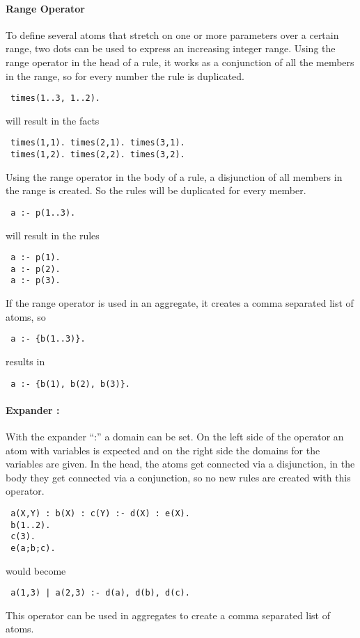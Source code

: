\documentclass[a4paper,10pt]{article}
\begin{document}
\paragraph{Range Operator}
To define several atoms that stretch on one or more parameters over a certain range, two dots can be used to express an increasing integer range.
Using the range operator in the head of a rule, it works as a conjunction of all the members in the range, so for every number the rule is duplicated.
\begin{verbatim}
 times(1..3, 1..2).
\end{verbatim}
will result in the facts
\begin{verbatim}
 times(1,1). times(2,1). times(3,1).
 times(1,2). times(2,2). times(3,2).
\end{verbatim}

Using the range operator in the body of a rule, a disjunction of all members in the range is created. So the rules will be duplicated for every member.
\begin{verbatim}
 a :- p(1..3).
\end{verbatim}
will result in the rules
\begin{verbatim}
 a :- p(1).
 a :- p(2).
 a :- p(3).
\end{verbatim}
If the range operator is used in an aggregate, it creates a comma separated list of atoms, so
\begin{verbatim}
 a :- {b(1..3)}.
\end{verbatim}
results in
\begin{verbatim}
 a :- {b(1), b(2), b(3)}.
\end{verbatim}

\paragraph{Expander :}
With the expander ``:'' a domain can be set.
On the left side of the operator an atom with variables is expected and on the right side the domains for the variables are given.
In the head, the atoms get connected via a disjunction, in the body they get connected via a conjunction, so no new rules are created with this operator.
\begin{verbatim}
 a(X,Y) : b(X) : c(Y) :- d(X) : e(X).
 b(1..2).
 c(3).
 e(a;b;c).
\end{verbatim}
would become
\begin{verbatim}
 a(1,3) | a(2,3) :- d(a), d(b), d(c).
\end{verbatim}
This operator can be used in aggregates to create a comma separated list of atoms.
\end{document}
